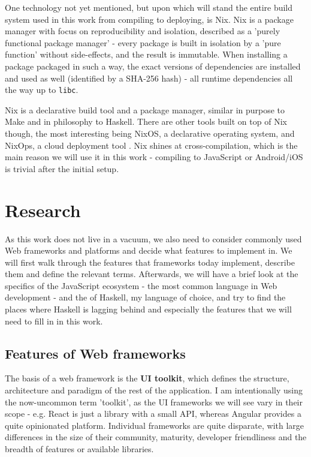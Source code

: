 \documentclass[english,odsaz]{fitthesis}
\begin{document}
One technology not yet mentioned, but upon which will stand the entire build
system used in this work from compiling to deploying, is Nix. Nix
\cite{dolstra2006purely} is a package manager with focus on reproducibility and
isolation, described as a 'purely functional package manager' - every package is
built in isolation by a 'pure function' without side-effects, and the result is
immutable. When installing a package packaged in such a way, the exact versions
of dependencies are installed and used as well (identified by a SHA-256 hash) -
all runtime dependencies all the way up to \texttt{libc}.

Nix is a declarative build tool and a package manager, similar in purpose to
Make and in philosophy to Haskell. There are other tools built on top of Nix
though, the most interesting being NixOS, a declarative operating system, and
NixOps, a cloud deployment tool \cite{dolstra2008nixos}. Nix shines at
cross-compilation, which is the main reason we will use it in this work -
compiling to JavaScript or Android/iOS is trivial after the initial setup.

\chapter{Research}
\label{sec:orgf2bb1a7}
As this work does not live in a vacuum, we also need to consider commonly used
Web frameworks and platforms and decide what features to implement in. We will
first walk through the features that frameworks today implement, describe them
and define the relevant terms. Afterwards, we will have a brief look at the
specifics of the JavaScript ecosystem - the most common language in Web
development - and the of Haskell, my language of choice, and try to find the
places where Haskell is lagging behind and especially the features that we will
need to fill in in this work.

\section{Features of Web frameworks}
\label{sec:org6791863}
The basis of a web framework is the \textbf{UI toolkit}, which defines the structure,
architecture and paradigm of the rest of the application. I am intentionally
using the now-uncommon term 'toolkit', as the UI frameworks we will see vary in
their scope - e.g. React is just a library with a small API, whereas Angular
provides a quite opinionated platform. Individual frameworks are quite
disparate, with large differences in the size of their community, maturity,
developer friendliness and the breadth of features or available libraries.
\end{document}

